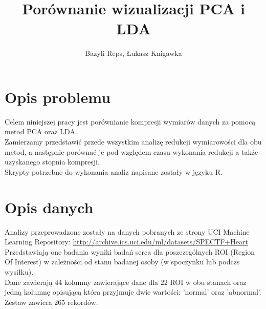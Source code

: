 \documentclass[10pt,a4paper]{article}
\begin{document}
\title{Porównanie wizualizacji PCA i LDA}
\author{Bazyli Reps, Łukasz Knigawka}
\maketitle
\tableofcontents

\newpage

\section{Opis problemu}
Celem niniejszej pracy jest porównianie kompresji wymiarów danych za pomocą metod PCA oraz LDA. 
\\
Zamierzamy przedstawić przede wszystkim analizę redukcji wymiarowości dla obu metod, a następnie porównać je pod względem czasu wykonania redukcji a także uzyskanego stopnia kompresji. 
\\
Skrypty potrzebne do wykonania analiz napisane zostały w języku R.

\section{Opis danych}
Analizy przeprowadzone zostały na danych pobranych ze strony UCI Machine Learning Repository:
\url{http://archive.ics.uci.edu/ml/datasets/SPECTF+Heart}
\\
Przedstawiają one badania wyniki badań serca dla poszczególnych ROI (Region Of Interest) w zależności od stanu badanej osoby (w spoczynku lub podczs wysiłku).
\\
Dane zawierają 44 kolumny zawierające dane dla 22 ROI w obu stanach oraz jedną kolumnę opisującą która przyjmuje dwie wartości: 'normal' oraz 'abnormal'. Zestaw zawiera 265 rekordów.

\newpage
\end{document}

